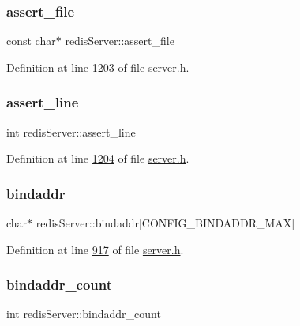 \subsubsection{\texorpdfstring{assert\+\_\+file}{assert\_file}}
{\footnotesize\ttfamily const char$\ast$ redis\+Server\+::assert\+\_\+file}



Definition at line \hyperlink{server_8h_source_l01203}{1203} of file \hyperlink{server_8h_source}{server.\+h}.

\mbox{\label{structredisServer_ac3a56910cc37ca8fdfea5a68fa4bf1e8}} 
\subsubsection{\texorpdfstring{assert\+\_\+line}{assert\_line}}
{\footnotesize\ttfamily int redis\+Server\+::assert\+\_\+line}



Definition at line \hyperlink{server_8h_source_l01204}{1204} of file \hyperlink{server_8h_source}{server.\+h}.

\mbox{\label{structredisServer_aaab03483b0257322b00e1ae97014edb9}} 
\subsubsection{\texorpdfstring{bindaddr}{bindaddr}}
{\footnotesize\ttfamily char$\ast$ redis\+Server\+::bindaddr\mbox{[}C\+O\+N\+F\+I\+G\+\_\+\+B\+I\+N\+D\+A\+D\+D\+R\+\_\+\+M\+AX\mbox{]}}



Definition at line \hyperlink{server_8h_source_l00917}{917} of file \hyperlink{server_8h_source}{server.\+h}.

\mbox{\label{structredisServer_ac02bb6ad87acf18bbfb3849294d97751}} 
\subsubsection{\texorpdfstring{bindaddr\+\_\+count}{bindaddr\_count}}
{\footnotesize\ttfamily int redis\+Server\+::bindaddr\+\_\+count}



